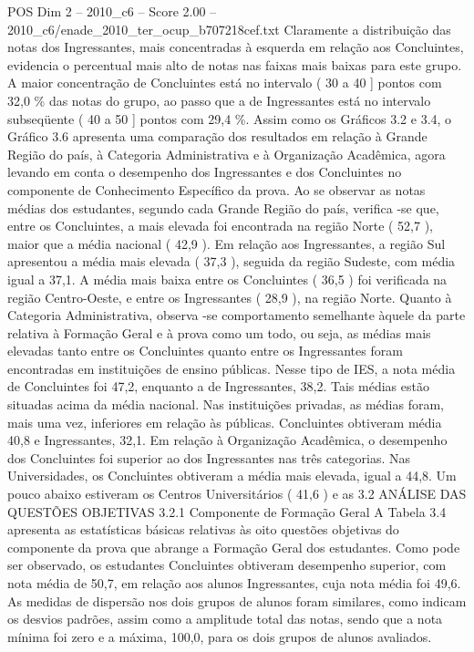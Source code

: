 \begin{textsample}{POS Dim 2 – 2010\_c6 – Score 2.00 – 2010\_c6/enade\_2010\_ter\_ocup\_b707218cef.txt}
Claramente a distribuição das notas dos Ingressantes, mais concentradas à esquerda em relação aos Concluintes, evidencia o percentual mais alto de notas nas faixas mais baixas para este grupo.
A maior concentração de Concluintes está no intervalo ( 30 a 40 ] pontos com 32,0 \% das notas do grupo, ao passo que a de Ingressantes está no intervalo subseqüente ( 40 a 50 ] pontos com 29,4 \%.
Assim como os Gráficos 3.2 e 3.4, o Gráfico 3.6 apresenta uma comparação dos resultados em relação à Grande Região do país, à Categoria Administrativa e à Organização Acadêmica, agora levando em conta o desempenho dos Ingressantes e dos Concluintes no componente de Conhecimento Específico da prova.
Ao se observar as notas médias dos estudantes, segundo cada Grande Região do país, verifica -se que, entre os Concluintes, a mais elevada foi encontrada na região Norte ( 52,7 ), maior que a média nacional ( 42,9 ).
Em relação aos Ingressantes, a região Sul apresentou a média mais elevada ( 37,3 ), seguida da região Sudeste, com média igual a 37,1.
A média mais baixa entre os Concluintes ( 36,5 ) foi verificada na região Centro-Oeste, e entre os Ingressantes ( 28,9 ), na região Norte.
Quanto à Categoria Administrativa, observa -se comportamento semelhante àquele da parte relativa à Formação Geral e à prova como um todo, ou seja, as médias mais elevadas tanto entre os Concluintes quanto entre os Ingressantes foram encontradas em instituições de ensino públicas.
Nesse tipo de IES, a nota média de Concluintes foi 47,2, enquanto a de Ingressantes, 38,2.
Tais médias estão situadas acima da média nacional.
Nas instituições privadas, as médias foram, mais uma vez, inferiores em relação às públicas.
Concluintes obtiveram média 40,8 e Ingressantes, 32,1.
Em relação à Organização Acadêmica, o desempenho dos Concluintes foi superior ao dos Ingressantes nas três categorias.
Nas Universidades, os Concluintes obtiveram a média mais elevada, igual a 44,8.
Um pouco abaixo estiveram os Centros Universitários ( 41,6 ) e as 3.2 ANÁLISE DAS QUESTÕES OBJETIVAS 3.2.1 Componente de Formação Geral A Tabela 3.4 apresenta as estatísticas básicas relativas às oito questões objetivas do componente da prova que abrange a Formação Geral dos estudantes.
Como pode ser observado, os estudantes Concluintes obtiveram desempenho superior, com nota média de 50,7, em relação aos alunos Ingressantes, cuja nota média foi 49,6.
As medidas de dispersão nos dois grupos de alunos foram similares, como indicam os desvios padrões, assim como a amplitude total das notas, sendo que a nota mínima foi zero e a máxima, 100,0, para os dois grupos de alunos avaliados.

\end{textsample}
